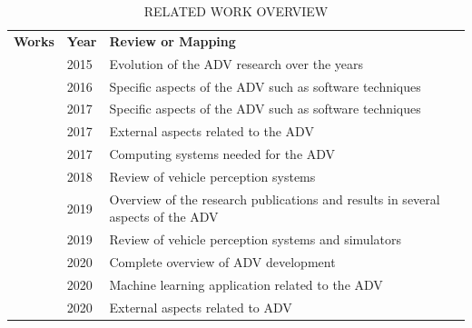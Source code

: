 \documentclass[lettersize,journal]{IEEEtran}
\begin{document}
\begin{table}[!ht]
  \centering  
  \captionsetup{
    format=hang, %
    justification=raggedright,
    singlelinecheck=false,
    skip=9pt, %
  }
  \caption{\MakeUppercase{RELATED WORK OVERVIEW}}
  \label{table:relatedWorks}
  \def\arraystretch{1.09}
  \begin{tabularx}{\textwidth}{>{\centering\arraybackslash}m{1.7cm}>{\centering\arraybackslash}m{1.7cm}X}
    \arrayrulecolor{white}
    \rowcolor{white}
    \textbf{Works} & \textbf{Year} & \textbf{Review or Mapping} \\
    \cite{Bimbraw2015}\cite{Rosenzweig2015} & \cellcolor{cor_tabela}2015 & Evolution of the ADV research over the years \\
    \arrayrulecolor{cor_tabela} \hline
    \cite{Paden2016} \cite{Bevly2016} & \cellcolor{cor_tabela}2016 & Specific aspects of the ADV such as software techniques \\
    \arrayrulecolor{cor_tabela} \hline
    \cite{Bresson2017} & \cellcolor{cor_tabela}2017 & Specific aspects of the ADV such as software techniques \\
    \arrayrulecolor{cor_tabela} \hline
    \cite{Brito2017} & \cellcolor{cor_tabela}2017 & External aspects related to the ADV \\
    \arrayrulecolor{cor_tabela} \hline
    \cite{Liu2017} & \cellcolor{cor_tabela}2017 & Computing systems needed for the ADV \\
    \arrayrulecolor{cor_tabela} \hline
    \cite{van2018} & \cellcolor{cor_tabela}2018 & Review of vehicle perception systems \\
    \arrayrulecolor{cor_tabela} \hline
    \cite{Hussain2019} \cite{Liu2019} & \cellcolor{cor_tabela}2019 & Overview of the research publications and results in several aspects of the ADV \\
    \arrayrulecolor{cor_tabela} \hline
    \cite{rosique2019} & \cellcolor{cor_tabela}2019 & Review of vehicle perception systems and simulators \\
    \arrayrulecolor{cor_tabela} \hline
    \cite{liu2020}  & \cellcolor{cor_tabela}2020 & Complete overview of ADV development \\
    \arrayrulecolor{cor_tabela} \hline
    \cite{Mozaffari2020} \cite{Aradi2020}  & \cellcolor{cor_tabela}2020 & Machine learning application related to the ADV \\
    \arrayrulecolor{cor_tabela} \hline
    \cite{Barnett2020} \cite{ElKhatib2020} & \cellcolor{cor_tabela}2020 & External aspects related to ADV \\

\end{tabularx}
\end{table}
\end{document}
